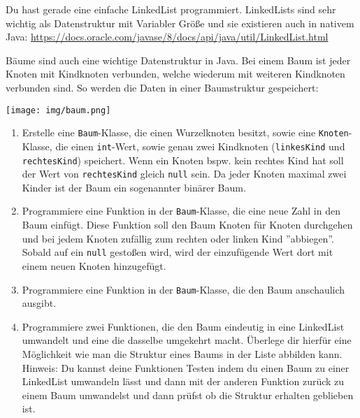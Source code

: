 \documentclass{../../sheet}
\begin{document}
Du hast gerade eine einfache LinkedList programmiert. LinkedLists sind sehr wichtig als Datenstruktur mit Variabler Größe und sie existieren auch in nativem Java: \url{https://docs.oracle.com/javase/8/docs/api/java/util/LinkedList.html}

\newpage
{}
Bäume sind auch eine wichtige Datenstruktur in Java. Bei einem Baum ist jeder Knoten mit Kindknoten verbunden, welche wiederum mit weiteren Kindknoten verbunden sind. So werden die Daten in einer Baumstruktur gespeichert:
\\
\begin{center}
    \texttt{[image: img/baum.png]}    
\end{center}

\begin{enumerate}
    \item Erstelle eine \texttt{Baum}-Klasse, die einen Wurzelknoten besitzt, sowie eine \texttt{Knoten}-Klasse, die einen \texttt{int}-Wert, sowie genau zwei Kindknoten (\texttt{linkesKind} und \texttt{rechtesKind}) speichert. Wenn ein Knoten bspw. kein rechtes Kind hat soll der Wert von \texttt{rechtesKind} gleich \texttt{null} sein. Da jeder Knoten maximal zwei Kinder ist der Baum ein sogenannter binärer Baum. 
    \item Programmiere eine Funktion in der \texttt{Baum}-Klasse, die eine neue Zahl in den Baum einfügt. Diese Funktion soll den Baum Knoten für Knoten durchgehen und bei jedem Knoten zufällig zum rechten oder linken Kind ''abbiegen''. Sobald auf ein \texttt{null} gestoßen wird, wird der einzufügende Wert dort mit einem neuen Knoten hinzugefügt. 
    \item Programmiere eine Funktion in der \texttt{Baum}-Klasse, die den Baum anschaulich ausgibt.
    \item Programmiere zwei Funktionen, die den Baum eindeutig in eine LinkedList umwandelt und eine die dasselbe umgekehrt macht. Überlege dir hierfür eine Möglichkeit wie man die Struktur eines Baums in der Liste abbilden kann. 
    Hinweis: Du kannst deine Funktionen Testen indem du einen Baum zu einer LinkedList umwandeln lässt und dann mit der anderen Funktion zurück zu einem Baum umwandelst und dann prüfst ob die Struktur erhalten geblieben ist. 
\end{enumerate}
\end{document}
